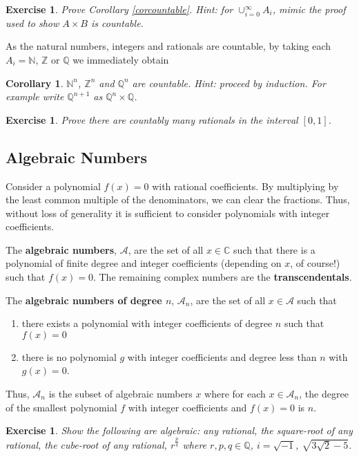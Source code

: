 \documentclass[12pt,letterpaper]{report}
\newcommand\ben{\begin{enumerate}}
\newcommand\een{\end{enumerate}}
\newcommand{\C}{\ensuremath{\mathbb{C}}}
\newcommand{\Z}{\ensuremath{\mathbb{Z}}}
\newcommand{\Q}{\mathbb{Q}}
\newcommand{\N}{\mathbb{N}}
\newtheorem{cor}[thm]{Corollary}
\newtheorem{exe}[thm]{Exercise}
\begin{document}
\begin{exe} Prove Corollary \ref{corcountable}. Hint: for $\cup_{i=0}^{\infty} A_i$,
mimic the proof used to show $A \times B$ is countable. \end{exe}

As the natural numbers, integers and rationals are countable, by
taking each $A_i = \N$, $\Z$ or $\Q$ we immediately obtain

\begin{cor}\label{cornzq} $\N^n$, $\Z^n$ and $\Q^n$ are countable. Hint:
proceed by induction. For example write $\Q^{n+1}$ as $\Q^n \times
\Q$. \end{cor}

\begin{exe} Prove there are countably many rationals in the
interval $[0,1]$. \end{exe}

\subsection{Algebraic Numbers}

Consider a polynomial $f(x) = 0$ with rational coefficients. By
multiplying by the least common multiple of the denominators, we
can clear the fractions. Thus, without loss of generality it is
sufficient to consider polynomials with integer coefficients.

The \textbf{algebraic numbers}, $\mathcal{A}$, are the set of all
$x \in \C$ such that there is a polynomial of finite degree and
integer coefficients (depending on $x$, of course!) such that
$f(x) = 0$. The remaining complex numbers are the
\textbf{transcendentals}.

The \textbf{algebraic numbers of degree $n$}, $\mathcal{A}_n$, are
the set of all $x \in \mathcal{A}$ such that

\ben
\item there exists a polynomial with integer coefficients of degree $n$
such that $f(x) = 0$

\item there is no polynomial $g$ with integer coefficients and
degree less than $n$ with $g(x) = 0$.

\een

Thus, $\mathcal{A}_n$ is the subset of algebraic numbers $x$ where
for each $x \in \mathcal{A}_n$, the degree of the smallest
polynomial $f$ with integer coefficients and $f(x) = 0$ is $n$.

\begin{exe} Show the following are algebraic: any rational, the square-root of any
rational, the cube-root of any rational, $r^{\frac{p}{q}}$ where
$r, p, q \in \Q$, $i =\sqrt{-1}$, $\sqrt{3\sqrt{2} - 5}$.
\end{exe}
\end{document}
